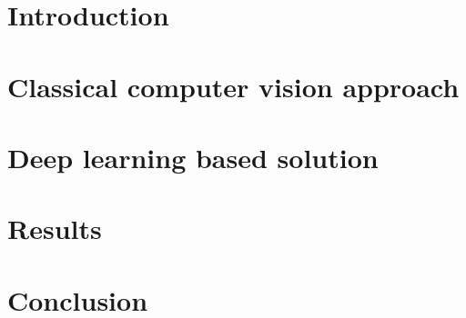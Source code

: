 \section{Introduction}

\section{Classical computer vision approach}

\section{Deep learning based solution}

\section{Results}

\section{Conclusion}
